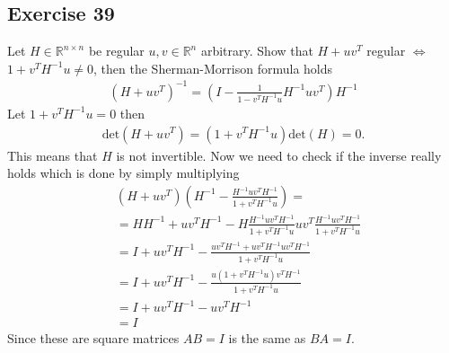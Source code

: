 \subsection{Exercise 39}
Let $H \in \mathbb{R}^{n \times n}$ be regular $u, v \in \mathbb{R}^{n}$
arbitrary. Show that $H+uv^T$ regular $\Leftrightarrow$  $1+v^TH^{-1}u \neq
0$, then the Sherman-Morrison formula holds
\begin{align}
    \left( H + uv^T \right)^{-1} = \left( I - \frac{1}{1-v^TH^{-1} u} H^{-1}
    uv^T\right)H^{-1} \label{eq: smf}
\end{align}
Let $1+ v^TH^{-1}u =0$ then
\begin{align}
    \text{det}\left( H + uv^T \right) =(1+v^T H^{-1} u)\text{det}(H) = 0.
\end{align}
This means that $H$ is not invertible. Now we need to check if the inverse
really holds which is done by simply multiplying
\begin{align}
    &\left( H+uv^{T} \right) \left( H^{-1} - \frac{H^{-1} uv^T
    H^{-1}}{1+v^{T}H^{-1}u} \right)  = \\
    &=H H^{-1} + uv^T H^{-1}  - H \frac{H^{-1}uv^T H^{-1}}{1+v^TH^{-1}u}
    uv^{T}\frac{H^{-1}uv^TH^{-1}}{1+v^{T}H^{-1}u}\\
    &=I + uv^T H^{-1} - \frac{uv^T H^{-1} + uv^T H^{-1}uv^T
    H^{-1}}{1+v^TH^{-1}u}\\
    &=I+uv^TH^{-1} - \frac{u\left( 1+v^{T}H^{-1}u \right)
    v^{T}H^{-1}}{1+v^{T}H^{-1} u}\\
    &=I + uv^{T}H^{-1} - uv^{T}H^{-1} \\
    &= I
\end{align}
Since these are square matrices $AB=I$ is the same as $BA=I$.

